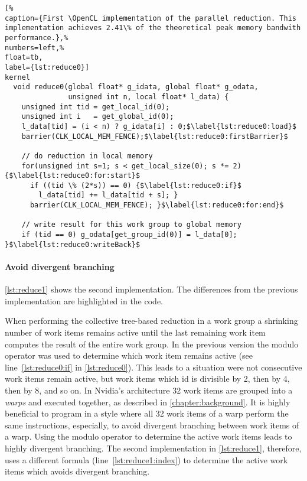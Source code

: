 \begin{lstlisting}[%                                                             
caption={First \OpenCL implementation of the parallel reduction. This implementation achieves 2.41\% of the theoretical peak memory bandwith performance.},%
numbers=left,%
float=tb,
label={lst:reduce0}]
kernel
  void reduce0(global float* g_idata, global float* g_odata,
               unsigned int n, local float* l_data) {
    unsigned int tid = get_local_id(0);
    unsigned int i   = get_global_id(0);
    l_data[tid] = (i < n) ? g_idata[i] : 0;$\label{lst:reduce0:load}$
    barrier(CLK_LOCAL_MEM_FENCE);$\label{lst:reduce0:firstBarrier}$

    // do reduction in local memory
    for(unsigned int s=1; s < get_local_size(0); s *= 2) {$\label{lst:reduce0:for:start}$
      if ((tid \% (2*s)) == 0) {$\label{lst:reduce0:if}$
        l_data[tid] += l_data[tid + s]; }
      barrier(CLK_LOCAL_MEM_FENCE); }$\label{lst:reduce0:for:end}$

    // write result for this work group to global memory
    if (tid == 0) g_odata[get_group_id(0)] = l_data[0]; }$\label{lst:reduce0:writeBack}$
\end{lstlisting}

\paragraph{Avoid divergent branching}

\autoref{lst:reduce1} shows the second implementation.
The differences from the previous implementation are highlighted in the code.

When performing the collective tree-based reduction in a work group a shrinking number of work items remains active until the last remaining work item computes the result of the entire work group.
In the previous version the modulo operator was used to determine which work item remains active (see line~\ref{lst:reduce0:if} in \autoref{lst:reduce0}).
This leads to a situation were not consecutive work items remain active, but work items which id is divisible by 2, then by 4, then by 8, and so on.
In Nvidia's \GPU architecture 32 work items are grouped into a \emph{warps} and executed together, as described in \autoref{chapter:background}.
It is highly beneficial to program in a style where all 32 work items of a warp perform the same instructions, especially, to avoid divergent branching between work items of a warp.
Using the modulo operator to determine the active work items leads to highly divergent branching.
The second implementation in \autoref{lst:reduce1}, therefore, uses a different formula (line~\ref{lst:reduce1:index}) to determine the active work items which avoids divergent branching.

